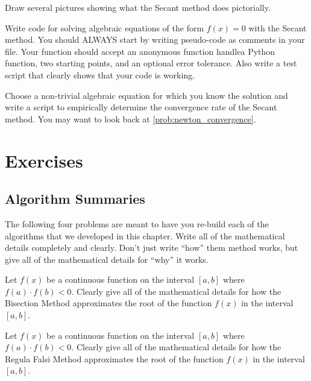 \begin{problem}
    Draw several pictures showing what the Secant method does pictorially.
\end{problem}

\begin{problem}
    Write \ProgLang code for solving algebraic equations of the form $f(x) = 0$ with the
    Secant method.  You should ALWAYS start by writing pseudo-code as comments in your
    \ProgLang file.   Your function should accept \ifnum{} an anonymous function
    handle\else a Python function\fi, two starting
    points, and an optional error tolerance.  Also write a test script that clearly shows that your code is working.
    \\
    \ifnum{}
    \else
    \fi
\end{problem}

\begin{problem}
    Choose a non-trivial algebraic equation for which you know the solution and write a
    script to empirically determine the convergence rate of the Secant method.  You may want to
    look back at \ref{prob:newton_convergence}.
\end{problem}





\newpage\section{Exercises}

\subsection{Algorithm Summaries}
The following four problems are meant to have you re-build each of the algorithms that
we developed in this chapter.  Write all of the mathematical details completely and
clearly.  Don't just write ``how'' them method works, but give all of the mathematical
details for ``why'' it works.
\begin{problem}
    Let $f(x)$ be a continuous function on the interval $[a,b]$ where $f(a) \cdot f(b) <
    0$.  Clearly give all of the mathematical details for how the Bisection Method
    approximates the root of the function $f(x)$ in the interval $[a,b]$.  
\end{problem}

\begin{problem}
    Let $f(x)$ be a continuous function on the interval $[a,b]$ where $f(a) \cdot f(b) <
    0$.  Clearly give all of the mathematical details for how the Regula Falsi Method
    approximates the root of the function $f(x)$ in the interval $[a,b]$. 
\end{problem}

